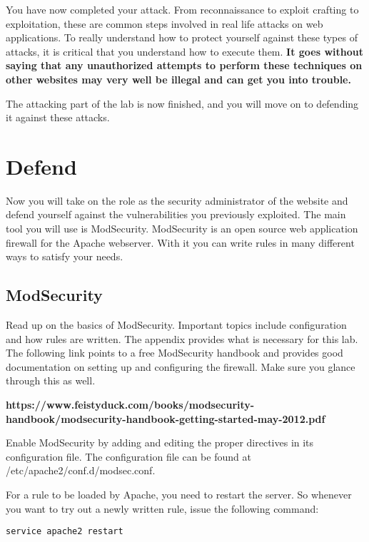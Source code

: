 \documentclass[EITN41]{../tex/cryptosecuritylab}
\begin{document}
You have now completed your attack. From reconnaissance to exploit crafting to exploitation, these are common steps involved in real life attacks on web applications. To really understand how to protect yourself against these types of attacks, it is critical that you understand how to execute them. \textbf{It goes without saying that any unauthorized attempts to perform these techniques on other websites may very well be illegal and can get you into trouble.}

The attacking part of the lab is now finished, and you will move on to defending it against these attacks.

\section{Defend}

Now you will take on the role as the security administrator of the website and defend yourself against the vulnerabilities you previously exploited. The main tool you will use is ModSecurity. ModSecurity is an open source web application firewall for the Apache webserver. With it you can write rules in many different ways to satisfy your needs.

\subsection{ModSecurity}

\bprepass
\item Read up on the basics of ModSecurity. Important topics include configuration and how rules are written. The appendix provides what is necessary for this lab. The following link points to a free ModSecurity handbook and provides good documentation on setting up and configuring the firewall. Make sure you glance through this as well.

\textbf{https://www.feistyduck.com/books/modsecurity-handbook/modsecurity-handbook-getting-started-may-2012.pdf}
\eprepass

Enable ModSecurity by adding and editing the proper directives in its configuration file. The configuration file can be found at /etc/apache2/conf.d/modsec.conf.

For a rule to be loaded by Apache, you need to restart the server. So whenever you want to try out a newly written rule, issue the following command:
\begin{verbatim}
service apache2 restart
\end{verbatim}
\end{document}
